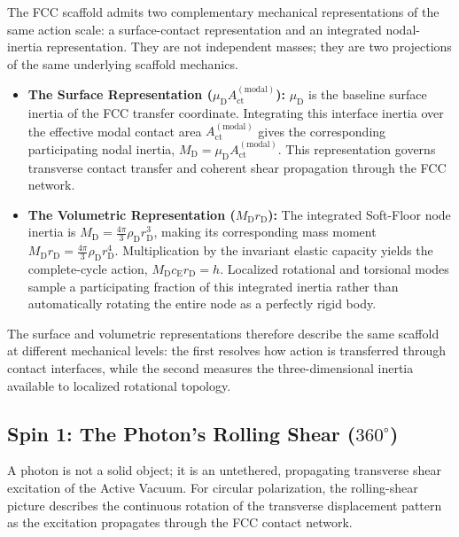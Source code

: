 The FCC scaffold admits two complementary mechanical representations of the same action scale: a surface-contact representation and an integrated nodal-inertia representation. They are not independent masses; they are two projections of the same underlying scaffold mechanics.

\begin{itemize}
    \item \textbf{The Surface Representation ($\mu_{\mathrm D}A_{\mathrm{ct}}^{(\mathrm{modal})}$):}
    $\mu_{\mathrm D}$ is the baseline surface inertia of the FCC transfer coordinate. Integrating this interface inertia over the effective modal contact area $A_{\mathrm{ct}}^{(\mathrm{modal})}$ gives the corresponding participating nodal inertia, $M_{\mathrm D} = \mu_{\mathrm D}A_{\mathrm{ct}}^{(\mathrm{modal})}$. This representation governs transverse contact transfer and coherent shear propagation through the FCC network.

    \item \textbf{The Volumetric Representation ($M_{\mathrm D}r_{\mathrm D}$):}
    The integrated Soft-Floor node inertia is $M_{\mathrm D} = \frac{4\pi}{3}\rho_{\mathrm D}r_{\mathrm D}^{3}$, making its corresponding mass moment $M_{\mathrm D}r_{\mathrm D} = \frac{4\pi}{3}\rho_{\mathrm D}r_{\mathrm D}^{4}$. Multiplication by the invariant elastic capacity yields the complete-cycle action, $M_{\mathrm D}c_{\mathrm E}r_{\mathrm D} = h$. Localized rotational and torsional modes sample a participating fraction of this integrated inertia rather than automatically rotating the entire node as a perfectly rigid body.
\end{itemize}

The surface and volumetric representations therefore describe the same scaffold at different mechanical levels: the first resolves how action is transferred through contact interfaces, while the second measures the three-dimensional inertia available to localized rotational topology.

\subsection{Spin 1: The Photon's Rolling Shear ($360^{\circ}$)}

A photon is not a solid object; it is an untethered, propagating transverse shear excitation of the Active Vacuum. For circular polarization, the rolling-shear picture describes the continuous rotation of the transverse displacement pattern as the excitation propagates through the FCC contact network.

